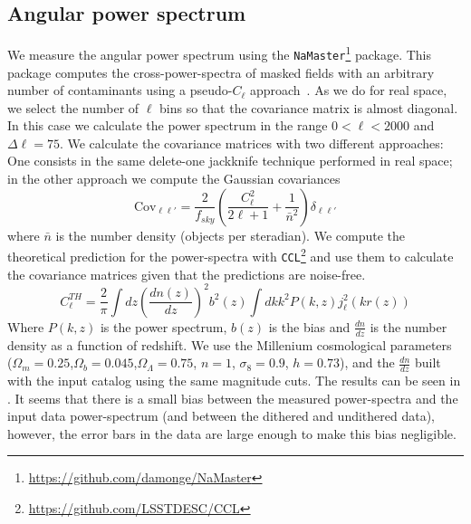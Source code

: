 \documentclass[\docopts]{\docclass}
\begin{document}
\subsection{Angular power spectrum}
We measure the angular power spectrum using the \texttt{NaMaster}\footnote{\url{https://github.com/damonge/NaMaster}} package. This package computes the cross-power-spectra of masked fields with an arbitrary number of contaminants using a pseudo-$C_{\ell}$ approach~\citep{2002ApJ...567....2H,2017MNRAS.465.1847E}. As we do for real space, we select the number of $\ell$ bins so that the covariance matrix is almost diagonal. In this case we calculate the power spectrum in the range $0 < \ell < 2000$ and $\Delta \ell = 75$. We calculate the covariance matrices with two different approaches: One consists in the same delete-one jackknife technique performed in real space; in the other approach we compute the Gaussian covariances~\citep{Dodelson:1282338,2007MNRAS.381.1347C}
\begin{equation}
\mathrm{Cov}_{\ell\ell'}=\frac{2}{f_{sky}}\left(\frac{C_{\ell}^{2}}{2\ell+1}+\frac{1}{\bar{n}^{2}}\right)\delta_{\ell\ell'}
\end{equation}
where $\bar{n}$ is the number density (objects per steradian). We compute the theoretical prediction for the power-spectra with \texttt{CCL}\footnote{\url{https://github.com/LSSTDESC/CCL}} and use them to calculate the covariance matrices given that the predictions are noise-free.
\begin{equation}
C_{\ell}^{TH} = \frac{2}{\pi}\int{dz} \left(\frac{dn(z)}{dz}\right)^{2} b^{2}(z) \int{dk k^{2} P(k,z)j^{2}_{\ell}(kr(z))}
\end{equation}
Where $P(k,z)$ is the power spectrum, $b(z)$ is the bias and $\frac{dn}{dz}$ is the number density as a function of redshift. We use the Millenium cosmological parameters~\citep{2005Nature.435.629S} ($\Omega_{m}=0.25$,$\Omega_{b}=0.045$,$\Omega_{\Lambda}=0.75$, $n=1$, $\sigma_{8}=0.9$, $h=0.73$), and the $\frac{dn}{dz}$ built with the input catalog using the same magnitude cuts. The results can be seen in . It seems that there is a small bias between the measured power-spectra and the input data power-spectrum (and between the dithered and undithered data), however, the error bars in the data are large enough to make this bias negligible.
\end{document}
